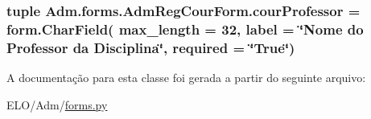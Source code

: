 \hypertarget{classAdm_1_1forms_1_1AdmRegCourForm_a6fcfad36a149364899dc7c95f239691f}{
\subsubsection[{cour\-Professor}]{\setlength{\rightskip}{0pt plus 5cm}tuple Adm.\-forms.\-Adm\-Reg\-Cour\-Form.\-cour\-Professor = form.\-Char\-Field( max\-\_\-length = 32, label = \char`\"{}Nome do Professor da Disciplina\char`\"{}, required = \char`\"{}True\char`\"{})\hspace{0.3cm}{\ttfamily [static]}}}\label{classAdm_1_1forms_1_1AdmRegCourForm_a6fcfad36a149364899dc7c95f239691f}


A documentação para esta classe foi gerada a partir do seguinte arquivo\-:\begin{DoxyCompactItemize}
\item 
E\-L\-O/\-Adm/\hyperlink{Adm_2forms_8py}{forms.\-py}\end{DoxyCompactItemize}
